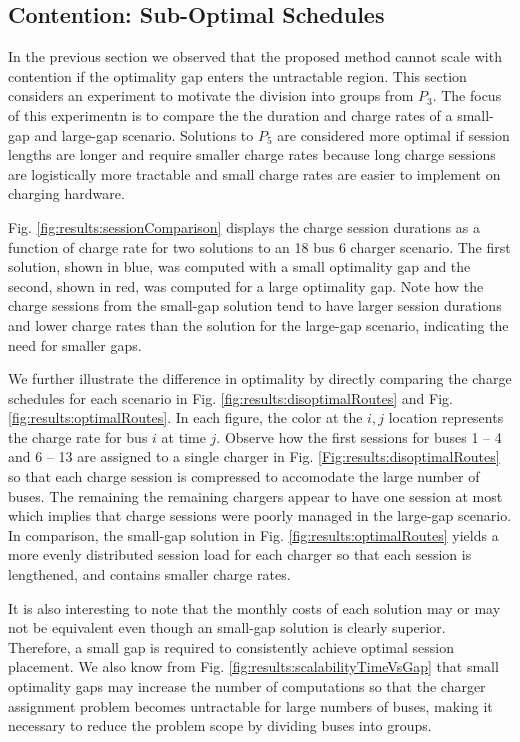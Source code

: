 \subsection{Contention: Sub-Optimal Schedules}
In the previous section we observed that the proposed method cannot scale with contention if the optimality gap enters the untractable region. This section considers an experiment to motivate the division into groups from $P_3$. The focus of this experimentn is to compare the the duration and charge rates of a small-gap and large-gap scenario. Solutions to $P_5$ are considered more optimal if session lengths are longer and require smaller charge rates because long charge sessions are logistically more tractable and small charge rates are easier to implement on charging hardware. 
\par Fig. \ref{fig:results:sessionComparison} displays the charge session durations as a function of charge rate for two solutions to an 18 bus 6 charger scenario. The first solution, shown in blue, was computed with a small optimality gap and the second, shown in red, was computed for a large optimality gap. Note how the charge sessions from the small-gap solution tend to have larger session durations and lower charge rates than the solution for the large-gap scenario, indicating the need for smaller gaps.
\par We further illustrate the difference in optimality by directly comparing the charge schedules for each scenario in Fig. \ref{fig:results:disoptimalRoutes} and Fig. \ref{fig:results:optimalRoutes}. In each figure, the color at the $i,j$ location represents the charge rate for bus $i$ at time $j$. Observe how the first sessions for buses 1 -- 4 and 6 -- 13 are assigned to a single charger in Fig. \ref{Fig:results:disoptimalRoutes} so that each charge session is compressed to accomodate the large number of buses. The remaining the remaining chargers appear to have one session at most which implies that charge sessions were poorly managed in the large-gap scenario. In comparison, the small-gap solution in Fig. \ref{fig:results:optimalRoutes} yields a more evenly distributed session load for each charger so that each session is lengthened, and contains smaller charge rates.
\par It is also interesting to note that the monthly costs of each solution may or may not be equivalent even though an small-gap solution is clearly superior. Therefore, a small gap is required to consistently achieve optimal session placement. We also know from Fig. \ref{fig:results:scalabilityTimeVsGap} that small optimality gaps may increase the number of computations so that the charger assignment problem becomes untractable for large numbers of buses, making it necessary to reduce the problem scope by dividing buses into groups. 

 

